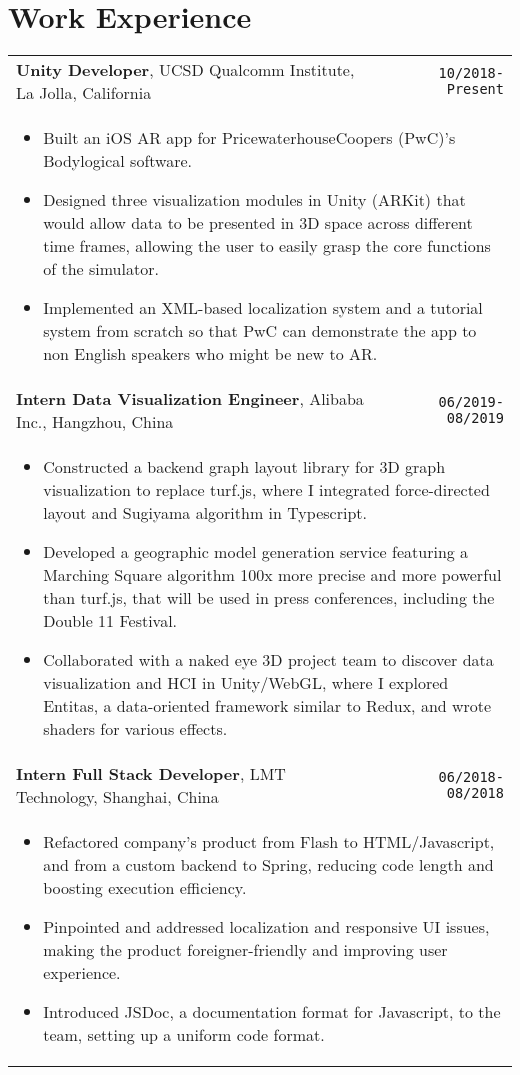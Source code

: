 \documentclass[10pt, letterpaper]{article}
\newcommand{\itemcols}[1]{
\multicolumn{2}{p{\dimexpr \linewidth-2\tabcolsep}}{
\begin{itemize}
#1
\end{itemize}
}
}
\begin{document}
\section{Work Experience}
\smallskip
\noindent
\begin{tabularx}{\textwidth}{X r}
\textbf{\large Unity Developer}, UCSD Qualcomm Institute, La Jolla, California & \texttt{10/2018-Present} \\
\itemcols{
\item Built an iOS AR app for PricewaterhouseCoopers (PwC)'s Bodylogical software.
\item Designed three visualization modules in Unity (ARKit) that would allow data to be presented in 3D space across different time frames, allowing the user to easily grasp the core functions of the simulator.
\item Implemented an XML-based localization system and a tutorial system from scratch so that PwC can demonstrate the app to non English speakers who might be new to AR.
} \\
\textbf{\large Intern Data Visualization Engineer}, Alibaba Inc., Hangzhou, China & \texttt{06/2019-08/2019} \\
\itemcols{
\item Constructed a backend graph layout library for 3D graph visualization to replace turf.js, where I integrated force-directed layout and Sugiyama algorithm in Typescript.
\item Developed a geographic model generation service featuring a Marching Square algorithm 100x more precise and more powerful than turf.js, that will be used in press conferences, including the Double 11 Festival.
\item Collaborated with a naked eye 3D project team to discover data visualization and HCI in Unity/WebGL, where I explored Entitas, a data-oriented framework similar to Redux, and wrote shaders for various effects.
} \\
\textbf{\large Intern Full Stack Developer}, LMT Technology, Shanghai, China & \texttt{06/2018-08/2018} \\
\itemcols{
\item Refactored company's product from Flash to HTML/Javascript, and from a custom backend to Spring, reducing code length and boosting execution efficiency.
\item Pinpointed and addressed localization and responsive UI issues, making the product foreigner-friendly and improving user experience.
\item Introduced JSDoc, a documentation format for Javascript, to the team, setting up a uniform code format.
} \\
\end{tabularx}
\end{document}
